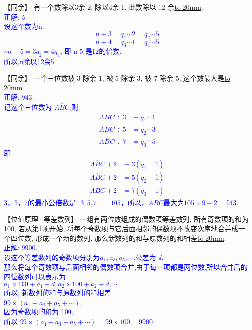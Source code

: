 \item {
    【同余】
    有一个数除以3余 2, 除以4余 1. 此数除以 12 余\underline{\hbox to 20mm{}}.
    \ifshowSolution
        \\\fangsong{}\textcolor{blue}{
            正解: 5.\\
            设这个数为n.
            \[ n \div 3 = q_1\cdots 2 = q_2\cdots 5 \]
            \[ n \div 4 = q_3\cdots 1 = q_4\cdots 5 \]
            $\therefore n-5 = 3q_2 = 4q_4$, 即 n-5 是12的倍数.\\
            所以,n除以12余5.
        }
    \else
        \vspace{1cm}
    \fi
}

\item {
    【同余】
    一个三位数被 3 除余 1, 被 5 除余 3, 被 7 除余 5, 这个数最大是\underline{\hbox to 20mm{}}.
    \ifshowSolution
        \\\fangsong{}\textcolor{blue}{
            正解: 943.\\
            记这个三位数为 $\overline{ABC}$.则
            \begin{align*}
                \overline{ABC} \div 3 &= q_1 \cdots 1\\
                \overline{ABC} \div 5 &= q_2 \cdots 3\\
                \overline{ABC} \div 7 &= q_3 \cdots 5
            \end{align*}
            即
            \begin{align*}
                \overline{ABC} + 2 &= 3(q_1+1)\\
                \overline{ABC}  + 2&= 5(q_2+1)\\
                \overline{ABC}  + 2 &= 7(q_3+1) 
            \end{align*}
            3，5，7的最小公倍数是$[3,5,7]=105$，所以，$\overline{ABC}$最大为$105\times 9 -2 = 943$.
        }
    \else
        \vspace{1cm}
    \fi
}

\item {
    【位值原理·等差数列】
    一组有两位数组成的偶数项等差数列, 所有奇数项的和为100, 若从第1项开始, 将每个奇数项与它后面相邻的偶数项不改变次序地合并成一个四位数, 形成一个新的数列, 那么新数列的和与原数列的和相差\underline{\hbox to 20mm{}}.
    \ifshowSolution
        \\\fangsong{}\textcolor{blue}{
            正解: 9900.\\
            设这个等差数列的奇数项分别为$a_1,a_3,a_5,\cdots$,公差为 $d$,\\
            那么将每个奇数项与后面相邻的偶数项合并,由于每一项都是两位数,所以合并后的四位数列可以表示为\\
            $a_1\times 100 + a_1+d, a_2\times 100 + a_2 + d,\cdots$\\
            所以, 新数列的和与原数列的和相差\\
            $99\times (a_1+a_3+a_5+\cdots)$,\\
            因为奇数项的和为 100, \\
            所以 $99\times (a_1+a_3+a_5+\cdots) = 99\times 100 = 9900$.
        }
    \else
        \vspace{1cm}
    \fi
}
